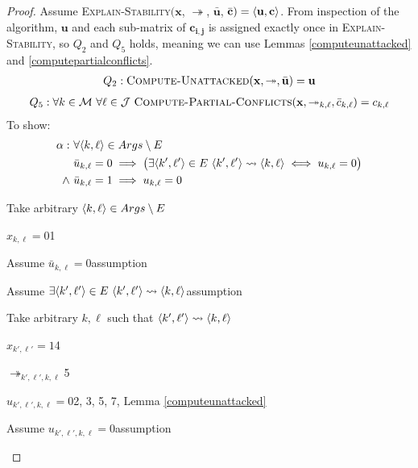 \begin{proof}
	Assume \textsc{Explain-Stability}$(\mathbf{x}$, $\twoheadrightarrow$, $\bar{\mathbf{u}}$, $\bar{\mathbf{c}})=\langle{\mathbf{u}},{\mathbf{c}}\rangle$. From inspection of the algorithm, $\mathbf{u}$ and each sub-matrix of $\mathbf{c_{i,j}}$ is assigned exactly once in \textsc{Explain-Stability}, so $Q_2$ and $Q_5$ holds, meaning we can use Lemmas \ref{computeunattacked} and \ref{computepartialconflicts}. 
	\begin{align*}
		Q_2: \textsc{Compute-Unattacked}(\mathbf{x},\twoheadrightarrow,\bar{\mathbf{u}})=\mathbf{u}
	\end{align*}
	\begin{align*}
		Q_5: \forall k\in\mathcal{M}\ \forall\ell\in\mathcal{J}\ \textsc{Compute-Partial-Conflicts}(\mathbf{x},\twoheadrightarrow_{k,\ell},\bar{c}_{k,\ell})=c_{k,\ell}
	\end{align*}
	To show:
	\begin{align*}
		\alpha:\ &\forall\langle{k},{\ell}\rangle\in Args\setminus E\\
		&\bar{u}_{k,\ell}=0\implies\big(\exists\langle{k'},{\ell'}\rangle\in E\ \langle{k'},{\ell'}\rangle\rightsquigarrow\langle{k},{\ell}\rangle\iff u_{k,\ell}=0\big)\\
		\land\ &\bar{u}_{k,\ell}=1\implies u_{k,\ell}=0\\
	\end{align*}
	\begin{enumerate}
		\item Take arbitrary $\langle{k},{\ell}\rangle\in Args\setminus E$
		\item $x_{k,\ell}=0$\hfill 1
		\item Assume $\bar{u}_{k,\ell}=0$\hfill assumption
			\item Assume $u_{k',\ell',k,\ell}=0$\hfill assumption
			\begin{level}

\end{level}
\end{level}
\end{enumerate}
\end{proof}
